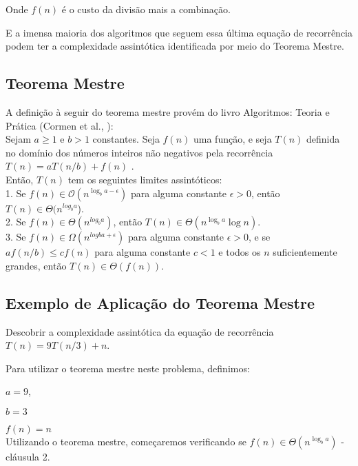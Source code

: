 \documentclass[a4paper, twocolumn]{article}
\theoremstyle{definition}
\begin{document}
	Onde $f(n)$ é o custo da divisão mais a combinação.
	
	E a imensa maioria dos algoritmos que seguem essa última equação de recorrência podem ter a complexidade assintótica identificada por meio do Teorema Mestre.
	
	\subsection{Teorema Mestre}
	
	A definição à seguir do teorema mestre provém do livro Algoritmos: Teoria e Prática (Cormen et al., ): \\
	
	Sejam $a \geq 1$ e $b > 1$ constantes. Seja $f(n)$ uma função, e seja $T(n)$ definida  no  domínio dos  números  inteiros  não negativos pela recorrência \\
	
	 $T(n) = aT(n/b) + f(n)$ . \\
		
	Então, $T(n)$ tem os seguintes limites assintóticos: \\
	
	1. Se $f(n) \in \mathcal{O}(n^{\log_b a-\epsilon})$ para alguma constante  $\epsilon> 0$, então $T(n) \in \Theta(n^{log_ba}$). \\
	 
	2. Se $f(n) \in \Theta(n^{log_b a})$, então $T(n) \in \Theta(n^{\log_b a} \log n)$. \\
	
	3. Se $f(n) \in \Omega(n^{logb a+ \epsilon})$ para alguma constante $\epsilon > 0$, e se $af(n/b) \leq cf(n)$ para alguma constante $c < 1$ e todos os $n$ suficientemente grandes, então $T(n) \in \Theta(f(n))$.
	
	\subsection{Exemplo de Aplicação do Teorema Mestre}
	Descobrir a complexidade assintótica da equação de recorrência $T(n) = 9T(n/3)+ n$.
	
	Para utilizar o teorema mestre neste problema, definimos:
	
	$a=9$,
	
	$b=3$
	
	$f(n) = n$ \\
	
	Utilizando o teorema mestre, começaremos verificando se $f(n) \in \Theta(n^{\log_b a})$ - cláusula 2. \\
\end{document}
